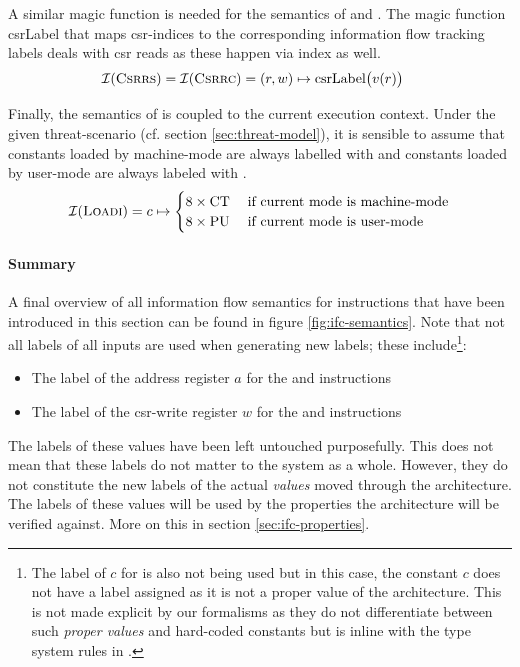 A similar magic function is needed for the semantics of  and .
The magic function \mbox{csrLabel} that maps \gls{csr}-indices to the corresponding information flow tracking labels deals with \gls{csr} reads as these happen via index as well.
\begin{align*}
    \mathcal{I}(\textsc{Csrrs}) = \mathcal{I}(\textsc{Csrrc}) &= (r, w) \mapsto \text{csrLabel}\big(v(r) \big)
\end{align*}

Finally, the semantics of  is coupled to the current execution context.
Under the given threat-scenario (cf. section \ref{sec:threat-model}), it is sensible to assume that constants loaded by machine-mode are always labelled with \CT{} and constants loaded by user-mode are always labeled with \PU{}.
\begin{equation*}
    \mathcal{I}(\textsc{Loadi}) = c \mapsto \begin{cases}
        8 \times \text{CT} & \; \text{if current mode is machine-mode} \\
        8 \times \text{PU} & \; \text{if current mode is user-mode}
    \end{cases}
\end{equation*}

\paragraph{Summary}
A final overview of all information flow semantics for instructions that have been introduced in this section can be found in figure \ref{fig:ifc-semantics}.
Note that not all labels of all inputs are used when generating new labels; these include\footnote{%
    The label of $ c $ for  is also not being used but in this case, the constant $ c $ does not have a label assigned as it is not a proper value of the architecture.
    This is not made explicit by our formalisms as they do not differentiate between such \textit{proper values} and hard-coded constants but is inline with the type system rules in \cite{Ferraiuolo17}.
}:
\begin{itemize}
    \item The label of the address register $ a $ for the  and  instructions
    \item The label of the \gls{csr}-write register $ w $ for the  and  instructions
\end{itemize}

The labels of these values have been left untouched purposefully.
This does not mean that these labels do not matter to the system as a whole.
However, they do not constitute the new labels of the actual \textit{values} moved through the architecture.
The labels of these values will be used by the properties the architecture will be verified against.
More on this in section \ref{sec:ifc-properties}.

